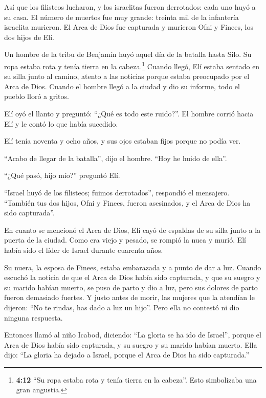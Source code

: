  Así que los filisteos lucharon, y los israelitas fueron
derrotados: cada uno huyó a su casa. El número de muertos fue muy
grande: treinta mil de la infantería israelita murieron. 
El Arca de Dios fue capturada y murieron Ofni y Finees, los dos hijos de
Elí.

 Un hombre de la tribu de Benjamín huyó aquel día de la
batalla hasta Silo. Su ropa estaba rota y tenía tierra en la
cabeza.\footnote{\textbf{4:12} ``Su ropa estaba rota y tenía tierra en
  la cabeza''. Esto simbolizaba una gran angustia.}  Cuando
llegó, Elí estaba sentado en su silla junto al camino, atento a las
noticias porque estaba preocupado por el Arca de Dios. Cuando el hombre
llegó a la ciudad y dio su informe, todo el pueblo lloró a gritos.

 Elí oyó el llanto y preguntó: ``¿Qué es todo este
ruido?''. El hombre corrió hacia Elí y le contó lo que había sucedido.

 Elí tenía noventa y ocho años, y sus ojos estaban fijos
porque no podía ver.

 ``Acabo de llegar de la batalla'', dijo el hombre. ``Hoy
he huido de ella''.

``¿Qué pasó, hijo mío?'' preguntó Elí.

 ``Israel huyó de los filisteos; fuimos derrotados'',
respondió el mensajero. ``También tus dos hijos, Ofni y Finees, fueron
asesinados, y el Arca de Dios ha sido capturada''.

 En cuanto se mencionó el Arca de Dios, Elí cayó de
espaldas de su silla junto a la puerta de la ciudad. Como era viejo y
pesado, se rompió la nuca y murió. Elí había sido el líder de Israel
durante cuarenta años.

 Su nuera, la esposa de Finees, estaba embarazada y a punto
de dar a luz. Cuando escuchó la noticia de que el Arca de Dios había
sido capturada, y que su suegro y su marido habían muerto, se puso de
parto y dio a luz, pero sus dolores de parto fueron demasiado fuertes.
 Y justo antes de morir, las mujeres que la atendían le
dijeron: ``No te rindas, has dado a luz un hijo''. Pero ella no contestó
ni dio ninguna respuesta.

 Entonces llamó al niño Icabod, diciendo: ``La gloria se ha
ido de Israel'', porque el Arca de Dios había sido capturada, y su
suegro y su marido habían muerto.  Ella dijo: ``La gloria
ha dejado a Israel, porque el Arca de Dios ha sido capturada.''

